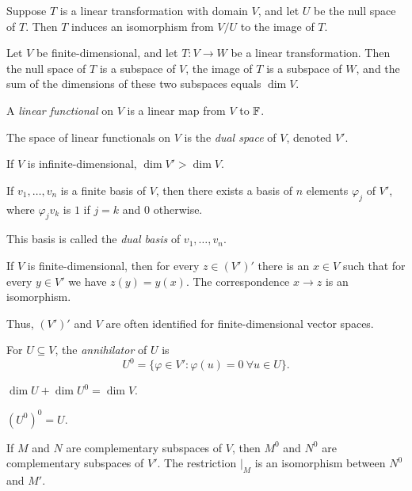 \begin{prop}
  Suppose $T$ is a linear transformation with domain $V$, and let $U$ be the
  null space of $T$.
  Then $T$ induces an isomorphism from $V/U$ to the image of $T$.
\end{prop}
\begin{cor}
  Let $V$ be finite-dimensional, and
  let $T:V\to W$ be a linear transformation. Then the null space of $T$ is a
  subspace of $V$, the image of $T$ is a subspace of $W$, and the sum of the
  dimensions of these two subspaces equals $\dim V$.
\end{cor}
\begin{defn}
  A \emph{linear functional} on $V$ is a linear map from $V$ to $\mathbb{F}$.

  The space of linear functionals on $V$ is the \emph{dual space} of $V$,
  denoted $V'$.
\end{defn}
\begin{prop}
  If $V$ is infinite-dimensional, $\dim V'>\dim V$.
\end{prop}
\begin{prop}
  If $v_1,\ldots,v_n$ is a finite basis of $V$, then there exists a basis of $n$
  elements $\varphi_j$ of $V'$, where $\varphi_j v_k$ is $1$ if $j=k$ and $0$
  otherwise.
\end{prop}
\begin{defn}
  This basis is called the \emph{dual basis} of
  $v_1,\ldots,v_n$.
\end{defn}
\begin{prop}
  If $V$ is finite-dimensional, then for every $z\in (V')'$ there is an $x\in V$
  such that for every $y\in V'$ we have $z(y)=y(x)$. The correspondence $x\to z$
  is an isomorphism.
\end{prop}
\begin{rem}
  Thus, $(V')'$ and $V$ are often identified for finite-dimensional vector
  spaces.
\end{rem}
\begin{defn}
  For $U\subseteq V$, the \emph{annihilator} of $U$ is
  \[U^0=\{\varphi\in V': \varphi(u)=0\ \forall u\in U\}.\]
\end{defn}
\begin{prop}
  $\dim U+\dim U^0=\dim V$.
\end{prop}
\begin{prop}
  $(U^0)^0=U$.
\end{prop}
\begin{prop}
  If $M$ and $N$ are complementary subspaces of $V$, then $M^0$ and $N^0$ are
  complementary subspaces of $V'$. The restriction $|_M$ is an isomorphism
  between $N^0$ and $M'$.
\end{prop}
